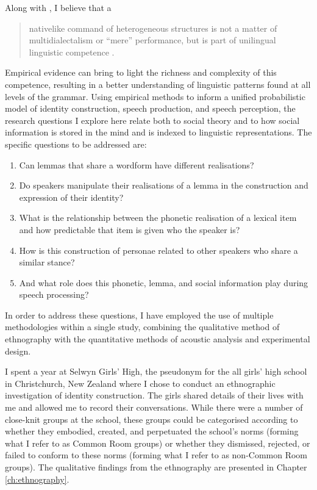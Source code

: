 Along with , I believe that a

\begin{quote}
	nativelike command of heterogeneous structures is not a matter of multidialectalism or ``mere'' performance, but is part of unilingual linguistic competence \cite[101]{weinrichlabovherzog1968}.
\end{quote}

\noindent Empirical evidence can bring to light the richness and complexity of this competence, resulting in a better understanding of linguistic patterns found at all levels of the grammar.  Using empirical methods to inform a unified probabilistic model of identity construction, speech production, and speech perception, the research questions I explore here relate both to social theory and to how social information is stored in the mind and is indexed to linguistic representations.  The specific questions to be addressed are:

\begin{enumerate}
	\item Can lemmas that share a wordform have different realisations? 
	\item Do speakers manipulate their realisations of a lemma in the construction and expression of their identity?  
	\item What is the relationship between the phonetic realisation of a lexical item and how predictable that item is given who the speaker is?
	\item How is this construction of personae related to other speakers who share a similar stance?
	\item And what role does this phonetic, lemma, and social information play during speech processing?   
\end{enumerate}

\noindent In order to address these questions, I have employed the use of multiple methodologies within a single study, combining the qualitative method of ethnography with the quantitative methods of acoustic analysis and experimental design. 

I spent a year at Selwyn Girls' High, the pseudonym for the all girls' high school in Christchurch, New Zealand where I chose to conduct an ethnographic investigation of identity construction.  The girls shared details of their lives with me and allowed me to record their conversations.  While there were a number of close-knit groups at the school, these groups could be categorised according to whether they embodied, created, and perpetuated the school's norms (forming what I refer to as Common Room groups) or whether they dismissed, rejected, or failed to conform to these norms (forming what I refer to as non-Common Room groups).  The qualitative findings from the ethnography are presented in Chapter \ref{ch:ethnography}.


